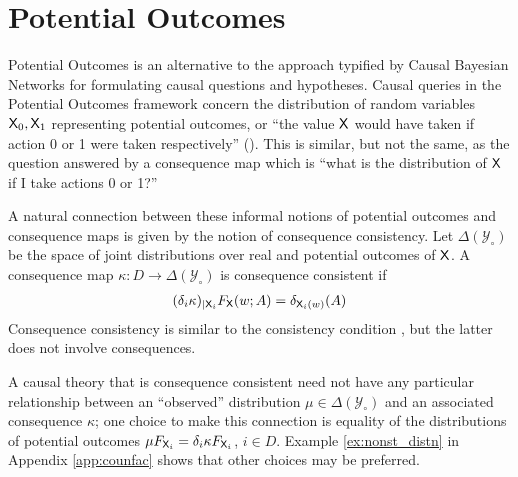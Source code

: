 
\section{Potential Outcomes}

Potential Outcomes is an alternative to the approach typified by Causal Bayesian Networks for formulating causal questions and hypotheses. Causal queries in the Potential Outcomes framework concern the distribution of random variables $\mathsf{X}_0, \mathsf{X}_1$ representing potential outcomes, or ``the value $\mathsf{X}$ would have taken if action 0 or 1 were taken respectively'' (\cite{hernan_causal_2018}). This is similar, but not the same, as the question answered by a consequence map which is ``what is the distribution of $\mathsf{X}$ if I take actions 0 or 1?''

A natural connection between these informal notions of potential outcomes and consequence maps is given by the notion of consequence consistency. Let $\Delta(\mathcal{Y}_\circ)$ be the space of joint distributions over real and potential outcomes of $\mathsf{X}$. A consequence map $\kappa:D\to \Delta(\mathcal{Y}_\circ)$ is consequence consistent if
\begin{align}
    (\delta_i\kappa)_{|\mathsf{X}_i} F_{\mathsf{X}} (w;A)=\delta_{\mathsf{X}_i(w)}(A) \label{eq:oc_consist}
\end{align} 
Consequence consistency is similar to the consistency condition \citep{richardson2013single}, but the latter does not involve consequences.

A causal theory that is consequence consistent need not have any particular relationship between an ``observed'' distribution $\mu\in \Delta(\mathcal{Y}_\circ)$ and an associated consequence $\kappa$; one choice to make this connection is equality of the distributions of potential outcomes $\mu F_{\mathsf{X}_i} = \delta_i \kappa F_{\mathsf{X}_i}$, $i\in D$. Example \ref{ex:nonst_distn} in Appendix \ref{app:counfac} shows that other choices may be preferred.


